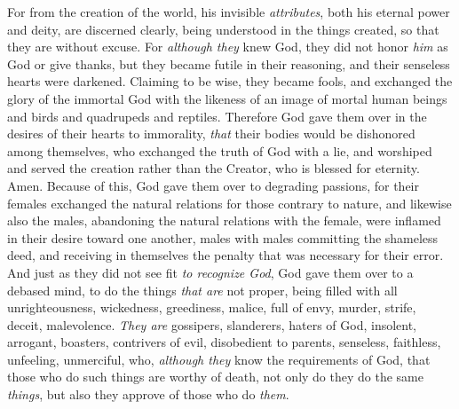 \begin{biblechapter}
\verse For from the creation of the world, his invisible \textit{attributes}, both his eternal power and deity, are discerned clearly, being understood in the things created, so that they are without excuse.
\verse For \textit{although they} knew God, they did not honor \textit{him} as God or give thanks, but they became futile in their reasoning, and their senseless hearts were darkened.
\verse Claiming to be wise, they became fools,
\verse and exchanged the glory of the immortal God with the likeness of an image of mortal human beings and birds and quadrupeds and reptiles.
\verse Therefore God gave them over in the desires of their hearts to immorality, \textit{that} their bodies would be dishonored among themselves,
\verse who exchanged the truth of God with a lie, and worshiped and served the creation rather than the Creator, who is blessed for eternity. Amen.
 Because of this, God gave them over to degrading passions, for their females exchanged the natural relations for those contrary to nature,
\verse and likewise also the males, abandoning the natural relations with the female, were inflamed in their desire toward one another, males with males committing the shameless deed, and receiving in themselves the penalty that was necessary for their error.
\verse And just as they did not see fit \textit{to recognize God}, God gave them over to a debased mind, to do the things \textit{that are} not proper,
\verse being filled with all unrighteousness, wickedness, greediness, malice, full of envy, murder, strife, deceit, malevolence. \textit{They are} gossipers,
\verse slanderers, haters of God, insolent, arrogant, boasters, contrivers of evil, disobedient to parents,
\verse senseless, faithless, unfeeling, unmerciful,
\verse who, \textit{although they} know the requirements of God, that those who do such things are worthy of death, not only do they do the same \textit{things}, but also they approve of those who do \textit{them}.
\end{biblechapter}

